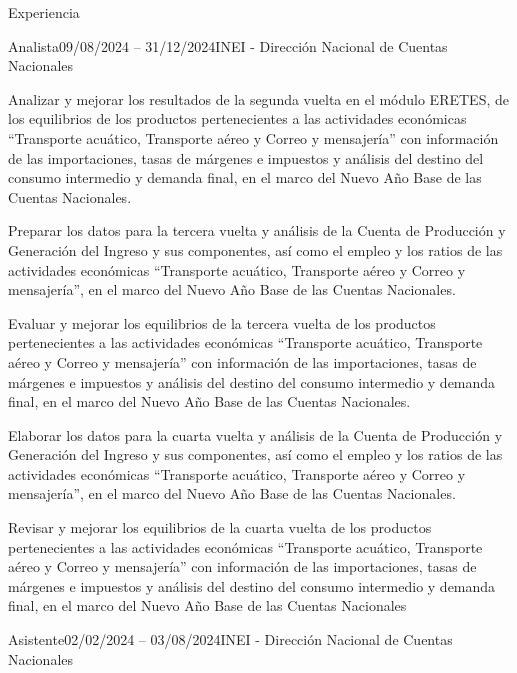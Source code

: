 \documentclass[
11pt, %
]{resume} %
\begin{document}
	\begin{rSection}{Experiencia}

		\begin{rSubsection}{Analista}{09/08/2024 – 31/12/2024}{INEI - Dirección Nacional de Cuentas Nacionales}{}
			
			\item  Analizar y mejorar los resultados de la segunda vuelta en el módulo ERETES, de los equilibrios de los productos pertenecientes a las actividades económicas “Transporte acuático, Transporte aéreo y Correo y mensajería” con información de las importaciones, tasas de márgenes e impuestos y análisis del destino del consumo intermedio y demanda final, en el marco del Nuevo Año Base de las Cuentas Nacionales.
            \item  Preparar los datos para la tercera vuelta y análisis de la Cuenta de Producción y Generación del Ingreso y sus componentes, así como el empleo y los ratios de las actividades económicas “Transporte acuático, Transporte aéreo y Correo y mensajería”, en el marco del Nuevo Año Base de las Cuentas Nacionales.
            \item Evaluar y mejorar los equilibrios de la tercera vuelta de los productos pertenecientes a las actividades económicas “Transporte acuático, Transporte aéreo y Correo y mensajería” con información de las importaciones, tasas de márgenes e impuestos y análisis del destino del consumo intermedio y demanda final, en el marco del Nuevo Año Base de las Cuentas Nacionales.
            \item Elaborar los datos para la cuarta vuelta y análisis de la Cuenta de Producción y Generación del Ingreso y sus componentes, así como el empleo y los ratios de las actividades económicas “Transporte acuático, Transporte aéreo y Correo y mensajería”, en el marco del Nuevo Año Base de las Cuentas Nacionales.
            \item Revisar y mejorar los equilibrios de la cuarta vuelta de los productos pertenecientes a las actividades económicas “Transporte acuático, Transporte aéreo y Correo y mensajería” con información de las importaciones, tasas de márgenes e impuestos y análisis del destino del consumo intermedio y demanda final, en el marco del Nuevo Año Base de las Cuentas Nacionales
			
		\end{rSubsection}
		

		\begin{rSubsection}{Asistente}{02/02/2024 – 03/08/2024}{INEI - Dirección Nacional de Cuentas Nacionales}{}
			

\end{rSubsection}
\end{rSection}
\end{document}
